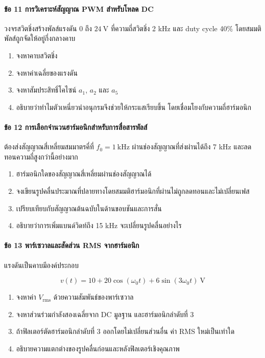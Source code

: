 \paragraph{ข้อ 11 การวิเคราะห์สัญญาณ PWM สำหรับโหลด DC}

วงจรสวิตชิ่งสร้างพัลส์แรงดัน \(0\) ถึง \(24\ \text{V}\) ที่ความถี่สวิตชิ่ง 2 kHz และ duty cycle 40\% โดยสมมติพัลส์ถูกจัดให้อยู่กึ่งกลางคาบ

\begin{enumerate}
\def\labelenumi{\arabic{enumi}.}
\item
  จงหาคาบสวิตชิ่ง
\item
  จงหาค่าเฉลี่ยของแรงดัน
\item
  จงหาสัมประสิทธิ์โคไซน์ \(a_1\), \(a_2\) และ \(a_5\)
\item
  อธิบายว่าทำไมตัวเหนี่ยวนำอนุกรมจึงช่วยให้กระแสเรียบขึ้น โดยเชื่อมโยงกับความถี่ฮาร์มอนิก
\end{enumerate}

\paragraph{ข้อ 12 การเลือกจำนวนฮาร์มอนิกสำหรับการสื่อสารพัลส์}

ต้องส่งสัญญาณสี่เหลี่ยมสมมาตรคี่ที่ \(f_0=1\ \text{kHz}\) ผ่านช่องสัญญาณที่ส่งผ่านได้ถึง 7 kHz และลดทอนความถี่สูงกว่านี้อย่างมาก

\begin{enumerate}
\def\labelenumi{\arabic{enumi}.}
\item
  ฮาร์มอนิกใดของสัญญาณสี่เหลี่ยมผ่านช่องสัญญาณได้
\item
  จงเขียนรูปคลื่นประมาณที่ปลายทางโดยสมมติฮาร์มอนิกที่ผ่านไม่ถูกลดทอนและไม่เปลี่ยนเฟส
\item
  เปรียบเทียบกับสัญญาณต้นฉบับในด้านขอบชันและการสั่น
\item
  อธิบายว่าการเพิ่มแบนด์วิดท์ถึง 15 kHz จะเปลี่ยนรูปคลื่นอย่างไร
\end{enumerate}

\paragraph{ข้อ 13 พาร์เซวาลและสัดส่วน RMS จากฮาร์มอนิก}

แรงดันเป็นคาบมีองค์ประกอบ

\[
v(t)=10+20\cos(\omega_0t)+6\sin(3\omega_0t)\ \text{V}
\]

\begin{enumerate}
\def\labelenumi{\arabic{enumi}.}
\item
  จงหาค่า \(V_{\mathrm{rms}}\) ด้วยความสัมพันธ์ของพาร์เซวาล
\item
  จงหาส่วนร่วมกำลังสองเฉลี่ยจาก DC มูลฐาน และฮาร์มอนิกลำดับที่ 3
\item
  ถ้าฟิลเตอร์ตัดฮาร์มอนิกลำดับที่ 3 ออกโดยไม่เปลี่ยนส่วนอื่น ค่า RMS ใหม่เป็นเท่าใด
\item
  อธิบายความแตกต่างของรูปคลื่นก่อนและหลังฟิลเตอร์เชิงคุณภาพ
\end{enumerate}

